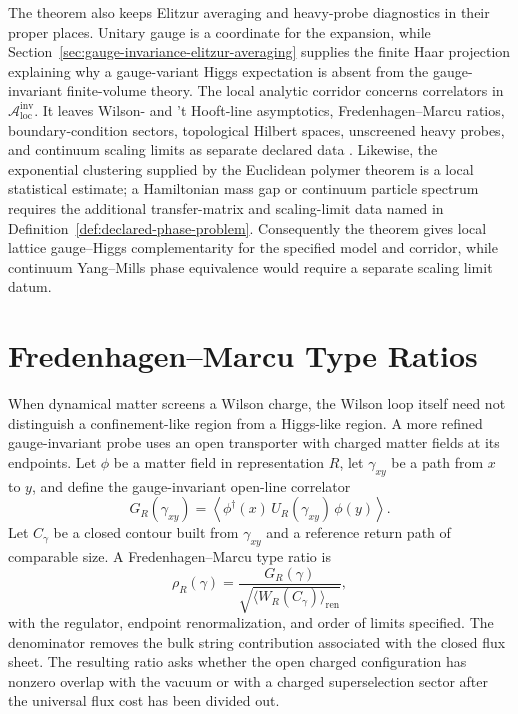 The theorem also keeps Elitzur averaging and heavy-probe diagnostics in their
proper places.  Unitary gauge is a coordinate for the expansion, while
Section~\ref{sec:gauge-invariance-elitzur-averaging} supplies the finite Haar
projection explaining why a gauge-variant Higgs expectation is absent from the
gauge-invariant finite-volume theory.  The local analytic corridor concerns
correlators in \(\mathcal A_{\mathrm{loc}}^{\mathrm{inv}}\).  It leaves
Wilson- and 't Hooft-line asymptotics, Fredenhagen--Marcu ratios,
boundary-condition sectors, topological Hilbert spaces, unscreened heavy
probes, and continuum scaling limits as separate declared data
\cite{FredenhagenMarcu1983ChargedZ2,CaudyGreensite2008GaugeAmbiguity}.
Likewise, the exponential clustering supplied by the Euclidean polymer theorem
is a local statistical estimate; a Hamiltonian mass gap or continuum particle
spectrum requires the additional transfer-matrix and scaling-limit data named
in Definition~\ref{def:declared-phase-problem}.  Consequently the theorem
gives local lattice gauge--Higgs complementarity for the specified model and
corridor, while continuum Yang--Mills phase equivalence would require a
separate scaling limit datum.

\section{Fredenhagen--Marcu Type Ratios}

When dynamical matter screens a Wilson charge, the Wilson loop itself need
not distinguish a confinement-like region from a Higgs-like region.  A more
refined gauge-invariant probe uses an open transporter with charged matter
fields at its endpoints.  Let \(\phi\) be a matter field in representation
\(R\), let \(\gamma_{xy}\) be a path from \(x\) to \(y\), and define the
gauge-invariant open-line correlator
\[
  G_R(\gamma_{xy})
  =
  \left\langle
    \phi^\dagger(x)\,
    U_R(\gamma_{xy})\,
    \phi(y)
  \right\rangle .
\]
Let \(C_{\gamma}\) be a closed contour built from \(\gamma_{xy}\) and a
reference return path of comparable size.  A Fredenhagen--Marcu type ratio is
\[
  \rho_R(\gamma)
  =
  \frac{G_R(\gamma)}
  {\sqrt{\langle W_R(C_\gamma)\rangle_{\mathrm{ren}}}} ,
\]
with the regulator, endpoint renormalization, and order of limits specified.
The denominator removes the bulk string contribution associated with the
closed flux sheet.  The resulting ratio asks whether the open charged
configuration has nonzero overlap with the vacuum or with a charged
superselection sector after the universal flux cost has been divided out.

